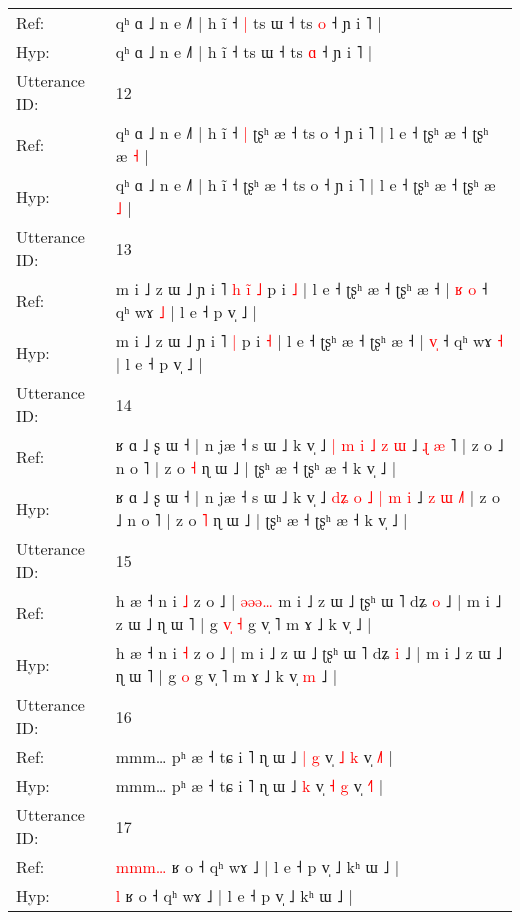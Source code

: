 \documentclass[10pt]{article}
\DeclareRobustCommand{\hl}[1]{{\textcolor{red}{#1}}}
\begin{document}
\begin{longtable}{ll}
Ref: & qʰ ɑ ˩ n e ˩˥ | h ĩ ˧\hl{ }\hl{|} ts ɯ ˧ ts \hl{o} ˧ ɲ i ˥ |
 \\
Hyp: & qʰ ɑ ˩ n e ˩˥ | h ĩ ˧\hl{}\hl{} ts ɯ ˧ ts \hl{ɑ} ˧ ɲ i ˥ |
 \\
\midrule
Utterance ID: & 12 \\
Ref: & qʰ ɑ ˩ n e ˩˥ | h ĩ ˧\hl{ }\hl{|} ʈʂʰ æ ˧ ts o ˧ ɲ i ˥ | l e ˧ ʈʂʰ æ ˧ ʈʂʰ æ \hl{˧} |
 \\
Hyp: & qʰ ɑ ˩ n e ˩˥ | h ĩ ˧\hl{}\hl{} ʈʂʰ æ ˧ ts o ˧ ɲ i ˥ | l e ˧ ʈʂʰ æ ˧ ʈʂʰ æ \hl{˩} |
 \\
\midrule
Utterance ID: & 13 \\
Ref: & m i ˩ z ɯ ˩ ɲ i ˥\hl{ }\hl{h}\hl{ }\hl{i}\hl{̃} \hl{˩} p i \hl{˩} | l e ˧ ʈʂʰ æ ˧ ʈʂʰ æ ˧ | \hl{ʁ}\hl{ }\hl{o} ˧ qʰ wɤ \hl{˩} | l e ˧ p v̩ ˩ |
 \\
Hyp: & m i ˩ z ɯ ˩ ɲ i ˥\hl{}\hl{}\hl{}\hl{}\hl{} \hl{|} p i \hl{˧} | l e ˧ ʈʂʰ æ ˧ ʈʂʰ æ ˧ | \hl{}\hl{v}\hl{̩} ˧ qʰ wɤ \hl{˧} | l e ˧ p v̩ ˩ |
 \\
\midrule
Utterance ID: & 14 \\
Ref: & ʁ ɑ ˩ ʂ ɯ ˧ | n jæ ˧ s ɯ ˩ k v̩ ˩ \hl{}\hl{|} \hl{m} \hl{i} \hl{˩} \hl{z} \hl{ɯ} ˩ \hl{ɻ} \hl{æ} \hl{}˥ | z o ˩ n o ˥ | z o \hl{˧} ɳ ɯ ˩ | ʈʂʰ æ ˧ ʈʂʰ æ ˧ k v̩ ˩ |
 \\
Hyp: & ʁ ɑ ˩ ʂ ɯ ˧ | n jæ ˧ s ɯ ˩ k v̩ ˩ \hl{d}\hl{ʑ} \hl{o} \hl{˩} \hl{|} \hl{m} \hl{i} ˩ \hl{z} \hl{ɯ} \hl{˩}˥ | z o ˩ n o ˥ | z o \hl{˥} ɳ ɯ ˩ | ʈʂʰ æ ˧ ʈʂʰ æ ˧ k v̩ ˩ |
 \\
\midrule
Utterance ID: & 15 \\
Ref: & h æ ˧ n i \hl{˩} z o ˩ |\hl{ }\hl{ə}\hl{ə}\hl{ə}\hl{…} m i ˩ z ɯ ˩ ʈʂʰ ɯ ˥ dʑ \hl{o} ˩ | m i ˩ z ɯ ˩ ɳ ɯ ˥ | g\hl{ }\hl{v}\hl{̩} \hl{˧} g v̩ ˥ m ɤ ˩ k v̩\hl{}\hl{} ˩ |
 \\
Hyp: & h æ ˧ n i \hl{˧} z o ˩ |\hl{}\hl{}\hl{}\hl{}\hl{} m i ˩ z ɯ ˩ ʈʂʰ ɯ ˥ dʑ \hl{i} ˩ | m i ˩ z ɯ ˩ ɳ ɯ ˥ | g\hl{}\hl{}\hl{} \hl{o} g v̩ ˥ m ɤ ˩ k v̩\hl{ }\hl{m} ˩ |
 \\
\midrule
Utterance ID: & 16 \\
Ref: & mmm… pʰ æ ˧ tɕ i ˥ ɳ ɯ ˩\hl{ }\hl{|} \hl{g} v̩ \hl{˩} \hl{k} v̩ \hl{˩}˥ |
 \\
Hyp: & mmm… pʰ æ ˧ tɕ i ˥ ɳ ɯ ˩\hl{}\hl{} \hl{k} v̩ \hl{˧} \hl{g} v̩ \hl{˧}˥ |
 \\
\midrule
Utterance ID: & 17 \\
Ref: & \hl{m}\hl{m}\hl{m}\hl{…} ʁ o ˧ qʰ wɤ ˩ | l e ˧ p v̩ ˩ kʰ ɯ ˩ |
 \\
Hyp: & \hl{}\hl{}\hl{}\hl{l} ʁ o ˧ qʰ wɤ ˩ | l e ˧ p v̩ ˩ kʰ ɯ ˩ |
 \\

\end{longtable}
\end{document}
